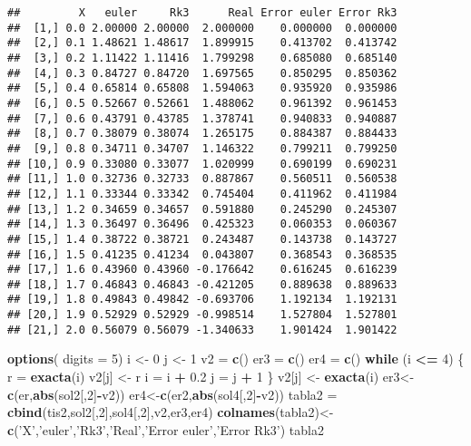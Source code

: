 \documentclass[]{article}
\newenvironment{Shaded}{\begin{snugshade}}{\end{snugshade}}
\newcommand{\KeywordTok}[1]{\textcolor[rgb]{0.13,0.29,0.53}{\textbf{#1}}}
\newcommand{\DataTypeTok}[1]{\textcolor[rgb]{0.13,0.29,0.53}{#1}}
\newcommand{\DecValTok}[1]{\textcolor[rgb]{0.00,0.00,0.81}{#1}}
\newcommand{\FloatTok}[1]{\textcolor[rgb]{0.00,0.00,0.81}{#1}}
\newcommand{\StringTok}[1]{\textcolor[rgb]{0.31,0.60,0.02}{#1}}
\newcommand{\ControlFlowTok}[1]{\textcolor[rgb]{0.13,0.29,0.53}{\textbf{#1}}}
\newcommand{\OperatorTok}[1]{\textcolor[rgb]{0.81,0.36,0.00}{\textbf{#1}}}
\newcommand{\NormalTok}[1]{#1}
\begin{document}
\begin{verbatim}
##         X   euler     Rk3      Real Error euler Error Rk3
##  [1,] 0.0 2.00000 2.00000  2.000000    0.000000  0.000000
##  [2,] 0.1 1.48621 1.48617  1.899915    0.413702  0.413742
##  [3,] 0.2 1.11422 1.11416  1.799298    0.685080  0.685140
##  [4,] 0.3 0.84727 0.84720  1.697565    0.850295  0.850362
##  [5,] 0.4 0.65814 0.65808  1.594063    0.935920  0.935986
##  [6,] 0.5 0.52667 0.52661  1.488062    0.961392  0.961453
##  [7,] 0.6 0.43791 0.43785  1.378741    0.940833  0.940887
##  [8,] 0.7 0.38079 0.38074  1.265175    0.884387  0.884433
##  [9,] 0.8 0.34711 0.34707  1.146322    0.799211  0.799250
## [10,] 0.9 0.33080 0.33077  1.020999    0.690199  0.690231
## [11,] 1.0 0.32736 0.32733  0.887867    0.560511  0.560538
## [12,] 1.1 0.33344 0.33342  0.745404    0.411962  0.411984
## [13,] 1.2 0.34659 0.34657  0.591880    0.245290  0.245307
## [14,] 1.3 0.36497 0.36496  0.425323    0.060353  0.060367
## [15,] 1.4 0.38722 0.38721  0.243487    0.143738  0.143727
## [16,] 1.5 0.41235 0.41234  0.043807    0.368543  0.368535
## [17,] 1.6 0.43960 0.43960 -0.176642    0.616245  0.616239
## [18,] 1.7 0.46843 0.46843 -0.421205    0.889638  0.889633
## [19,] 1.8 0.49843 0.49842 -0.693706    1.192134  1.192131
## [20,] 1.9 0.52929 0.52929 -0.998514    1.527804  1.527801
## [21,] 2.0 0.56079 0.56079 -1.340633    1.901424  1.901422
\end{verbatim}

\begin{Shaded}
\begin{Highlighting}[]
\KeywordTok{options}\NormalTok{( }\DataTypeTok{digits =} \DecValTok{5}\NormalTok{)}
\NormalTok{i <-}\StringTok{ }\DecValTok{0}
\NormalTok{j <-}\StringTok{ }\DecValTok{1}
\NormalTok{v2 =}\StringTok{ }\KeywordTok{c}\NormalTok{()}
\NormalTok{er3 =}\StringTok{ }\KeywordTok{c}\NormalTok{()}
\NormalTok{er4 =}\StringTok{ }\KeywordTok{c}\NormalTok{()}
\ControlFlowTok{while}\NormalTok{ (i }\OperatorTok{<=}\StringTok{ }\DecValTok{4}\NormalTok{)}
\NormalTok{\{}
\NormalTok{  r =}\StringTok{ }\KeywordTok{exacta}\NormalTok{(i)}
\NormalTok{  v2[j] <-}\StringTok{ }\NormalTok{r}
\NormalTok{  i =}\StringTok{ }\NormalTok{i }\OperatorTok{+}\StringTok{ }\FloatTok{0.2}
\NormalTok{  j =}\StringTok{ }\NormalTok{j }\OperatorTok{+}\StringTok{ }\DecValTok{1}
\NormalTok{\}}
\NormalTok{v2[j] <-}\StringTok{ }\KeywordTok{exacta}\NormalTok{(i)}
\NormalTok{er3<-}\KeywordTok{c}\NormalTok{(er,}\KeywordTok{abs}\NormalTok{(sol2[,}\DecValTok{2}\NormalTok{]}\OperatorTok{-}\NormalTok{v2))}
\NormalTok{er4<-}\KeywordTok{c}\NormalTok{(er2,}\KeywordTok{abs}\NormalTok{(sol4[,}\DecValTok{2}\NormalTok{]}\OperatorTok{-}\NormalTok{v2))}
\NormalTok{tabla2 =}\StringTok{ }\KeywordTok{cbind}\NormalTok{(tis2,sol2[,}\DecValTok{2}\NormalTok{],sol4[,}\DecValTok{2}\NormalTok{],v2,er3,er4)}
\KeywordTok{colnames}\NormalTok{(tabla2)<-}\KeywordTok{c}\NormalTok{(}\StringTok{'X'}\NormalTok{,}\StringTok{'euler'}\NormalTok{,}\StringTok{'Rk3'}\NormalTok{,}\StringTok{'Real'}\NormalTok{,}\StringTok{'Error euler'}\NormalTok{,}\StringTok{'Error Rk3'}\NormalTok{)}
\NormalTok{tabla2}
\end{Highlighting}
\end{Shaded}
\end{document}

